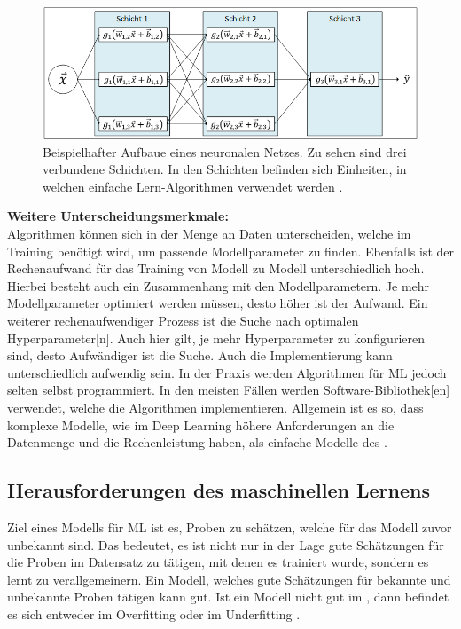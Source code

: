 \begin{figure}[htbp]
    \centering
    \includegraphics[width=\textwidth]{img/Grafiken/Aufbau Neuronales Netz.png}
    \caption[Beispielhafter Aufbaue eines neuronalen Netzes.]{Beispielhafter Aufbaue eines neuronalen Netzes. Zu sehen sind drei verbundene Schichten. In den Schichten befinden sich Einheiten, in welchen einfache Lern-Algorithmen verwendet werden \cite{Burkov.2019}.}
    \label{fig:SimpleDL}
\end{figure}

\par
\textbf{Weitere Unterscheidungsmerkmale:}\\
Algorithmen können sich in der Menge an Daten unterscheiden, welche im Training benötigt wird, um passende Modellparameter zu finden. Ebenfalls ist der Rechenaufwand für das Training von Modell zu Modell unterschiedlich hoch. Hierbei besteht auch ein Zusammenhang mit den Modellparametern. Je mehr Modellparameter optimiert werden müssen, desto höher ist der Aufwand. Ein weiterer rechenaufwendiger Prozess ist die Suche nach optimalen \gls{Hyperparameter}[n]. Auch hier gilt, je mehr Hyperparameter zu konfigurieren sind, desto Aufwändiger ist die Suche. Auch die Implementierung kann unterschiedlich aufwendig sein. In der Praxis werden Algorithmen für \gls{ML} jedoch selten selbst programmiert. In den meisten Fällen werden Software-\gls{Bibliothek}[en] verwendet, welche die Algorithmen implementieren. Allgemein ist es so, dass komplexe Modelle, wie im \gls{Deep Learning} höhere Anforderungen an die Datenmenge und die Rechenleistung haben, als einfache Modelle des  \cite{Burkov.2019, ShalevShwartz.2014}.


\subsection{Herausforderungen des maschinellen Lernens} \label{sec:Herausforderungen ML}
Ziel eines Modells für \gls{ML} ist es, Proben zu schätzen, welche für das Modell zuvor unbekannt sind. Das bedeutet, es ist nicht nur in der Lage gute Schätzungen für die Proben im Datensatz zu tätigen, mit denen es trainiert wurde, sondern es lernt zu verallgemeinern. Ein Modell, welches gute Schätzungen für bekannte und unbekannte Proben tätigen kann  gut. Ist ein Modell nicht gut im , dann befindet es sich entweder im \gls{Overfitting} oder im \gls{Underfitting} \cite{Burkov.2019}.\dubpar

